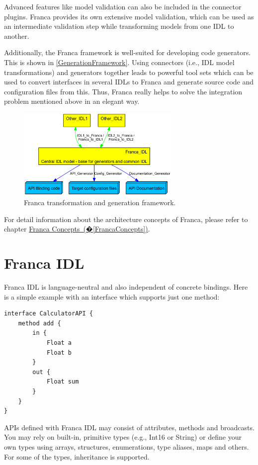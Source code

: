 \documentclass[a4paper,10pt]{scrreprt}
\begin{document}
Advanced features like model validation can also be included in the connector plugins.
Franca provides its own extensive model validation, which can be used as an
intermediate validation step while transforming models from one IDL to another.

Additionally, the Franca framework is well-suited for developing 
code generators. This is shown in \autoref{GenerationFramework}.
Using connectors (i.e., IDL model transformations) and
generators together leads to powerful tool sets which can be used to 
convert interfaces in several IDLs to Franca and generate source code and
configuration files from this. Thus, Franca really helps to solve the 
integration problem mentioned above in an elegant way.

\begin{figure}[!ht]
\centering
\includegraphics[width=0.70\textwidth]{images-gen/franca_generators_conceptual_hts_logical.png}
\caption{Franca transformation and generation framework.}
\label{GenerationFramework}
\end{figure}

For detail information about the architecture concepts of Franca,
please refer to chapter \hyperref[FrancaConcepts]{Franca Concepts~(�\ref*{FrancaConcepts})}.

\section{Franca IDL}
\label{Intro_FrancaIDL}
Franca IDL is language-neutral and also independent of concrete bindings.
Here is a simple example with an interface which supports just one method:


\begin{lstlisting}[language=Franca]
interface CalculatorAPI {
	method add {
		in {
			Float a
			Float b
		}
		out {
			Float sum
		}
	}
}
\end{lstlisting}

APIs defined with Franca IDL may consist of attributes, methods and broadcasts.
You may rely on built-in, primitive types (e.g., Int16 or String) or define your
own types using arrays, structures, enumerations, type aliases, maps and others.
For some of the types, inheritance is supported.
\end{document}
